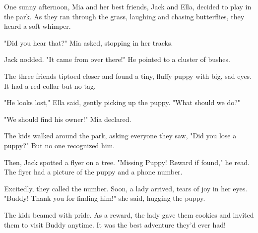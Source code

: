 \documentclass[12pt]{article}
\begin{document}
\begin{tcolorbox}[colframe=black!60, colback=white, 
coltitle=black, colbacktitle=black!15, fonttitle=\bfseries\Large, 
title=Text: The Lost Puppy Adventure, halign title=center, left=10pt, right=10pt, top=10pt, bottom=15pt]
One sunny afternoon, Mia and her best friends, Jack and Ella, decided to play in the park. As they ran through the grass, laughing and chasing butterflies, they heard a soft whimper.

"Did you hear that?" Mia asked, stopping in her tracks.

Jack nodded. "It came from over there!" He pointed to a cluster of bushes.

The three friends tiptoed closer and found a tiny, fluffy puppy with big, sad eyes. It had a red collar but no tag.

"He looks lost," Ella said, gently picking up the puppy. "What should we do?"

"We should find his owner!" Mia declared.

The kids walked around the park, asking everyone they saw, "Did you lose a puppy?" But no one recognized him.

Then, Jack spotted a flyer on a tree. "Missing Puppy! Reward if found," he read. The flyer had a picture of the puppy and a phone number.

Excitedly, they called the number. Soon, a lady arrived, tears of joy in her eyes. "Buddy! Thank you for finding him!" she said, hugging the puppy.

The kids beamed with pride. As a reward, the lady gave them cookies and invited them to visit Buddy anytime. It was the best adventure they’d ever had!

 
\end{tcolorbox}

\vspace{1em}
\end{document}
